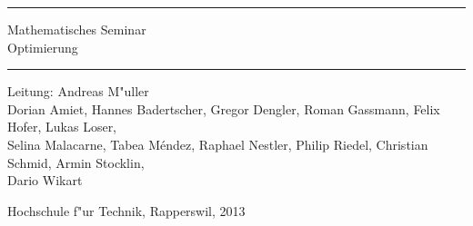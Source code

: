 \documentclass[a4paper,12pt]{book}
\begin{document}
\pagestyle{fancy}
\frontmatter
\newcommand\HRule{\noindent\rule{\linewidth}{1.5pt}}
\begin{titlepage}
\HRule
\vspace*{5pt}
\begin{flushright}
{
\LARGE
Mathematisches Seminar\\
\vspace*{20pt}
\Huge
Optimierung}
\end{flushright}
\HRule
\begin{flushright}
\vspace{60pt}
\Large
Leitung: Andreas M"uller\\
\vspace{40pt}
\Large
Dorian Amiet,
Hannes Badertscher,
Gregor Dengler,
Roman Gassmann,
Felix Hofer,
Lukas Loser,\\
Selina Malacarne,
Tabea M\'endez,
Raphael Nestler,
Philip Riedel,
Christian Schmid,
Armin Stocklin,\\
Dario Wikart
\end{flushright}


\begin{center}
Hochschule f"ur Technik, Rapperswil, 2013
\end{center}
\end{titlepage}
\hypersetup{
    colorlinks=true,
    linktoc=all,
    linkcolor=blue
}
\newenvironment{beispiele}{
\bgroup\smallskip\parindent0pt\bf Beispiele\egroup

\begin{list}{\arabic{beispiel}.}
  {\usecounter{beispiel}
  \setlength{\labelsep}{5mm}
  \setlength{\rightmargin}{0pt}
}}{\end{list}}

\newenvironment{teilaufgaben}{
\begin{enumerate}
\renewcommand{\labelenumi}{\alph{enumi})}
}{\end{enumerate}}
\def\swallow#1{
}
\newenvironment{loesung}{%
\begin{proof}[L"osung]%
\renewcommand{\qedsymbol}{$\bigcirc$}
}{\end{proof}}
\def\keineloesungen{%
\renewenvironment{loesung}{\swallow\begingroup}{\endgroup}%
}

\newenvironment{beispiel}{%
\begin{proof}[Beispiel]%
\renewcommand{\qedsymbol}{$\bigcirc$}
}{\end{proof}}
\end{document}
